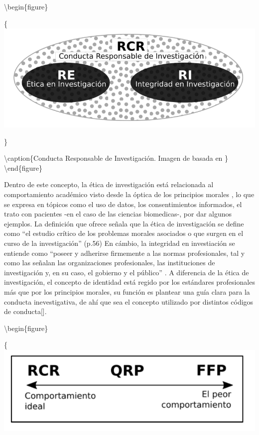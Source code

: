 \documentclass[
]{book}
\begin{document}
\textbackslash begin\{figure\}

\{\centering \includegraphics[width=1\linewidth]{docs/images/rcr}

\}

\textbackslash caption\{Conducta Responsable de Investigación. Imagen de \citet{abrilruiz_Manzanas_2019} basada en \citet{steneck_Fostering_2006}\}\label{fig:rcr}
\textbackslash end\{figure\}

Dentro de este concepto, la ética de investigación está relacionada al comportamiento académico visto desde la óptica de los principios morales \citep{steneck_Fostering_2006}, lo que se expresa en tópicos como el uso de datos, los consentimientos informados, el trato con pacientes -en el caso de las ciencias biomedicas-, por dar algunos ejemplos. La definición que ofrece \citet{steneck_Fostering_2006} señala que la ética de investigación se define como ``el estudio crítico de los problemas morales asociados o que surgen en el curso de la investigación'' (p.56) En cámbio, la integridad en investiación se entiende como ``poseer y adherirse firmemente a las normas profesionales, tal y como las señalan las organizaciones profesionales, las instituciones de investigación y, en su caso, el gobierno y el público'' \citep[p.56]{steneck_Fostering_2006}. A diferencia de la ética de investigación, el concepto de identidad está regido por los estándares profesionales más que por los principios morales, su función es plantear una guía clara para la conducta inevestigativa, de ahí que sea el concepto utilizado por distintos códigos de conducta{[}{]}.

\textbackslash begin\{figure\}

\{\centering \includegraphics[width=1\linewidth]{docs/images/grad}
\end{document}
